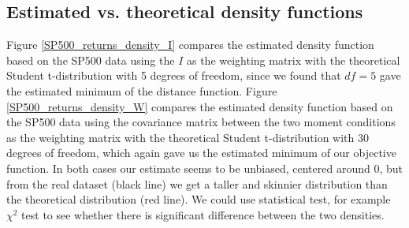 \subsection{Estimated vs. theoretical density functions}
Figure \ref{SP500_returns_density_I} compares the estimated density function based on the SP500 data using the $I$ as the weighting matrix with the theoretical Student t-distribution with 5 degrees of freedom, since we found that $df=5$ gave the estimated minimum of the distance function. Figure \ref{SP500_returns_density_W} compares the estimated density function based on the SP500 data using the covariance matrix between the two moment conditions as the weighting matrix with the theoretical Student t-distribution with 30 degrees of freedom, which again gave us the estimated minimum of our objective function. In both cases our estimate seems to be unbiased, centered around 0, but from the real dataset (black line) we get a taller and skinnier distribution than the theoretical distribution (red line). We could use statistical test, for example $\chi^2$ test to see whether there is significant difference between the two densities.


